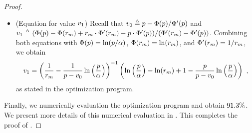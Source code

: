\begin{proof}
\begin{itemize}
        \item (Equation for value $v_1$) Recall that  $v_0 \triangleq p - \Phi(p) / \Phi'(p)$ and $v_1 \triangleq (\Phi(p) - \Phi(r_m) + r_m\cdot \Phi'(r_m) - p\cdot \Phi'(p))/(\Phi'(r_m) - \Phi'(p))$. Combining both equations with $\Phi(p) = \ln(p/\alpha)$, $\Phi(r_m) = \ln(r_m)$, and $\Phi'(r_m) = 1/r_m$, we obtain 
        \begin{align*}
            v_1 = \left(\frac{1}{r_m} - \frac{1}{p - v_0}\ln\left(\frac{p}{\alpha}\right)\right)^{-1}\left(
        \ln\left(\frac{p}{\alpha}\right) - \ln(r_m)
        + 1 
        - \frac{p}{p-v_0}\ln\left(\frac{p}{\alpha}\right) 
        \right)~,
        \end{align*}
        as stated in the optimization program.
    \end{itemize}
    Finally, we numerically evaluation the optimization program and obtain ${91.3\%}$. We present more details of this numerical evaluation in .
    This completes the proof of .
\end{proof}

